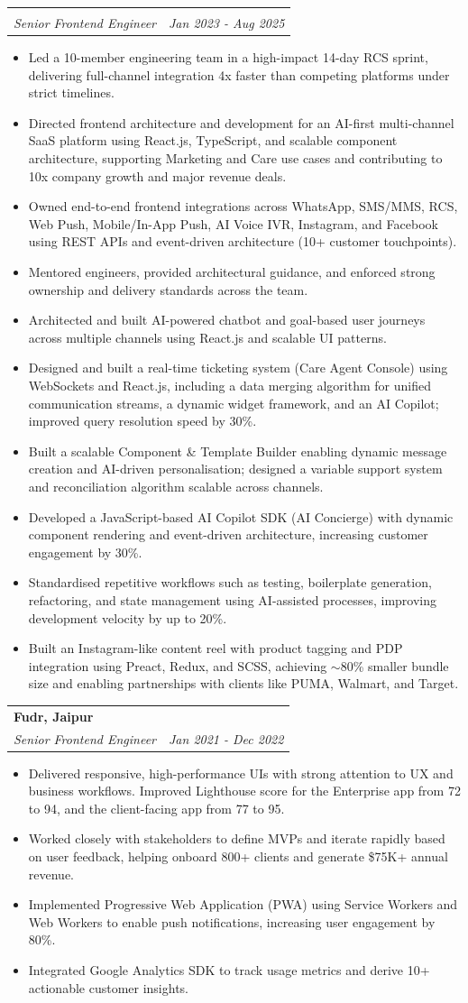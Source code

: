 \documentclass[letterpaper,11pt]{article}
\makeatletter
\newcommand{\resumeItem}[1]{\item \small{#1}}
\newcommand{\resumeSubheading}[4]{
  \vspace{-2pt}\item
  \begin{tabular*}{0.97\textwidth}[t]{l@{\extracolsep{\fill}}r}
    \textbf{#1} & #2 \\
    \textit{\small#3} & \textit{\small #4} \\
  \end{tabular*}\vspace{-6pt}
}
\newcommand{\resumeItemListStart}{\begin{itemize}[leftmargin=0.2in, label=\textbullet]}
\newcommand{\resumeItemListEnd}{\end{itemize}\vspace{-5pt}}
\makeatother
\begin{document}
\resumeSubheading
{}{}{Senior Frontend Engineer}{Jan 2023 - Aug 2025}
\resumeItemListStart
\resumeItem{Led a 10-member engineering team in a high-impact 14-day RCS sprint, delivering full-channel integration 4x faster than competing platforms under strict timelines.}
\resumeItem{Directed frontend architecture and development for an AI-first multi-channel SaaS platform using React.js, TypeScript, and scalable component architecture, supporting Marketing and Care use cases and contributing to 10x company growth and major revenue deals.}
\resumeItem{Owned end-to-end frontend integrations across WhatsApp, SMS/MMS, RCS, Web Push, Mobile/In-App Push, AI Voice IVR, Instagram, and Facebook using REST APIs and event-driven architecture (10+ customer touchpoints).}
\resumeItem{Mentored engineers, provided architectural guidance, and enforced strong ownership and delivery standards across the team.}
\resumeItem{Architected and built AI-powered chatbot and goal-based user journeys across multiple channels using React.js and scalable UI patterns.}
\resumeItem{Designed and built a real-time ticketing system (Care Agent Console) using WebSockets and React.js, including a data merging algorithm for unified communication streams, a dynamic widget framework, and an AI Copilot; improved query resolution speed by 30\%.}
\resumeItem{Built a scalable Component \& Template Builder enabling dynamic message creation and AI-driven personalisation; designed a variable support system and reconciliation algorithm scalable across channels.}
\resumeItem{Developed a JavaScript-based AI Copilot SDK (AI Concierge) with dynamic component rendering and event-driven architecture, increasing customer engagement by 30\%.}
\resumeItem{Standardised repetitive workflows such as testing, boilerplate generation, refactoring, and state management using AI-assisted processes, improving development velocity by up to 20\%.}
\resumeItem{Built an Instagram-like content reel with product tagging and PDP integration using Preact, Redux, and SCSS, achieving $\sim$80\% smaller bundle size and enabling partnerships with clients like PUMA, Walmart, and Target.}
\resumeItemListEnd

\resumeSubheading
{Fudr, Jaipur}{}{Senior Frontend Engineer}{Jan 2021 - Dec 2022}
\resumeItemListStart
\resumeItem{Delivered responsive, high-performance UIs with strong attention to UX and business workflows. Improved Lighthouse score for the Enterprise app from 72 to 94, and the client-facing app from 77 to 95.}
\resumeItem{Worked closely with stakeholders to define MVPs and iterate rapidly based on user feedback, helping onboard 800+ clients and generate \$75K+ annual revenue.}
\resumeItem{Implemented Progressive Web Application (PWA) using Service Workers and Web Workers to enable push notifications, increasing user engagement by 80\%.}
\resumeItem{Integrated Google Analytics SDK to track usage metrics and derive 10+ actionable customer insights.}
\resumeItemListEnd
\end{document}
